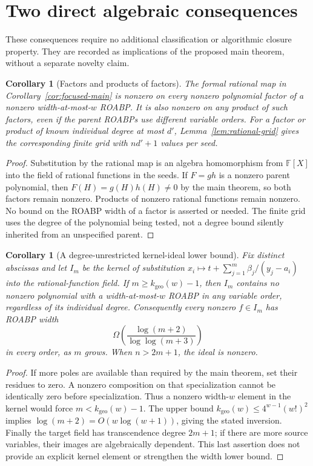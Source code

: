 \documentclass[11pt]{article}
\newtheorem{corollary}[theorem]{Corollary}
\theoremstyle{definition}\newtheorem{definition}[theorem]{Definition}
\theoremstyle{remark}\newtheorem{remark}[theorem]{Remark}
\newcommand{\F}{\mathbb F}
\begin{document}
\section{Two direct algebraic consequences}
These consequences require no additional classification or algorithmic
closure property. They are recorded as implications of the proposed main
theorem, without a separate novelty claim.

\begin{corollary}[Factors and products of factors]\label{cor:factors}
The formal rational map in Corollary~\ref{cor:focused-main} is nonzero on
every nonzero polynomial factor of a nonzero width-at-most-$w$ ROABP.
It is also nonzero on any product of such factors, even if the parent
ROABPs use different variable orders. For a factor or product of known
individual degree at most $d'$, Lemma~\ref{lem:rational-grid} gives the
corresponding finite grid with $nd'+1$ values per seed.
\end{corollary}
\begin{proof}
Substitution by the rational map is an algebra homomorphism from
$\F[X]$ into the field of rational functions in the seeds. If $F=gh$ is
a nonzero parent polynomial, then $F(H)=g(H)h(H)\ne0$ by the main theorem,
so both factors remain nonzero. Products of nonzero rational functions
remain nonzero. No bound on the ROABP width of a factor is asserted or
needed. The finite grid uses the degree of the polynomial being tested,
not a degree bound silently inherited from an unspecified parent.
\end{proof}

\begin{corollary}[A degree-unrestricted kernel-ideal lower bound]
Fix distinct abscissas and let $I_m$ be the kernel of substitution
$x_i\mapsto t+\sum_{j=1}^m\beta_j/(y_j-a_i)$ into the rational-function
field. If $m\ge k_{\mathrm{geo}}(w)-1$, then $I_m$ contains no nonzero
polynomial with a width-at-most-$w$ ROABP in any variable order, regardless
of its individual degree. Consequently every nonzero $f\in I_m$ has
ROABP width
\[
 \Omega\!\left(\frac{\log(m+2)}{\log\log(m+3)}\right)
\]
in every order, as $m$ grows. When $n>2m+1$, the ideal is nonzero.
\end{corollary}
\begin{proof}
If more poles are available than required by the main theorem, set their
residues to zero. A nonzero composition on that specialization cannot
be identically zero before specialization. Thus a nonzero width-$w$
element in the kernel would force $m<k_{\mathrm{geo}}(w)-1$.
The upper bound $k_{\mathrm{geo}}(w)\le4^{w-1}(w!)^2$ implies
$\log(m+2)=O(w\log(w+1))$, giving the stated inversion. Finally the target
field has transcendence degree $2m+1$; if there are more source variables,
their images are algebraically dependent. This last assertion does not
provide an explicit kernel element or strengthen the width lower bound.
\end{proof}
\end{document}
